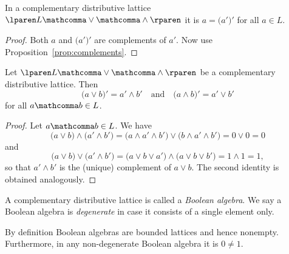 \begin{corollary}
  In a complementary distributive lattice
  $\lparen L \mathcomma \vee \mathcomma \wedge \rparen$
  it is
  $a \equal \lparen a \prime \rparen \prime$
  for all $a \in L$.
\end{corollary}

\begin{proof}
  Both $a$ and $\lparen a \prime \rparen \prime$
  are complements of $a \prime$.
  Now use Proposition~\ref{prop:complements}.
\end{proof}

\begin{proposition}
  Let
  $\lparen L \mathcomma \vee \mathcomma \wedge \rparen$
  be a complementary distributive lattice.
  Then
  \[
    \lparen a \vee b \rparen \prime
    \equal
    a \prime \wedge b \prime
    \quad \text{and} \quad
    \lparen a \wedge b \rparen \prime
    \equal
    a \prime \vee b \prime
  \]
  for all
  $a \mathcomma b \in L$.
\end{proposition}

\begin{proof}
  Let $a \mathcomma b \in L$.
  We have
  \[
    \lparen a \vee b \rparen \wedge \lparen a \prime \wedge b \prime \rparen
    \equal
    \lparen a \wedge a \prime \wedge b \prime \rparen
      \vee \lparen b \wedge a \prime \wedge b \prime \rparen
    \equal
    0 \vee 0
    \equal
    0
  \]
  and
  \[
    \lparen a \vee b \rparen \vee \lparen a \prime \wedge b \prime \rparen
    \equal
    \lparen a \vee b \vee a \prime \rparen
      \wedge \lparen a \vee b \vee b \prime \rparen
    \equal
    1 \wedge 1
    \equal
    1,
  \]
  so that
  $a \prime \wedge b \prime$
  is the (unique) complement of
  $a \vee b$.
  The second identity is obtained analogously.
\end{proof}

\begin{definition}
  A complementary distributive lattice is called a \emph{Boolean algebra}.
  We say a Boolean algebra is \emph{degenerate}
  in case it consists of a single element only.
\end{definition}

\begin{remark}
  By definition Boolean algebras are bounded lattices and hence nonempty.
  Furthermore, in any non-degenerate Boolean algebra it is $0 \ne 1$.
\end{remark}
